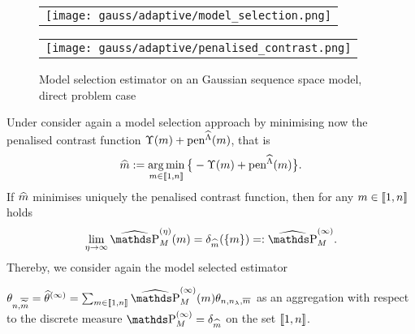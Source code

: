 \begin{figure}
\centering
  \begin{tabular}{@{}c@{}}
    \texttt{[image: gauss/adaptive/model\_selection.png]} \\[\abovecaptionskip]
  \end{tabular}
  \begin{tabular}{@{}c@{}}
    \texttt{[image: gauss/adaptive/penalised\_contrast.png]} \\[\abovecaptionskip]
  \end{tabular}
  \caption{Model selection estimator on an Gaussian sequence space model, direct problem case}
  \label{fig:ge:adaptive:selection}
\end{figure}

Under  consider again a  model selection approach by
minimising now the penalised contrast function $\Upsilon(m)+\mathop{\mathrm{pen}}\nolimits^{\widehat{\Lambda}} (m)$, that is
\begin{equation}\label{freq:ge:shape:uk:de:ms}
  \widehat{m}:=\operatorname*{arg\,min}_{m\in{\llbracket 1,n\rrbracket }} \big\{-\Upsilon(m)+\mathop{\mathrm{pen}}\nolimits^{\widehat{\Lambda}} (m)\big\}.
\end{equation}
If $\widehat{m}$ minimises uniquely the penalised contrast function, then for any $m\in{\llbracket 1,n \rrbracket }$ holds
\begin{equation}\label{freq:ge:shape:uk:de:msWe}
  \lim_{\rWc\to\infty}\erWe=\dirac[\hDi](\{\Di\})=:\widehat{\P}_{M}^{(\infty)}.
\end{equation}
Thereby, we consider again the model selected estimator

$\txdfPr[\tDi] = \widehat{\theta}^{(\infty)} = \sum_{\Di\in\nset{1,\ssY}}\widehat{\P}_{M}^{(\infty)}(m)\hxdfPr$ as an aggregation with respect to the discrete measure $\msWe[]=\dirac[\hDi]$ on the set ${\llbracket 1,n \rrbracket }$.

